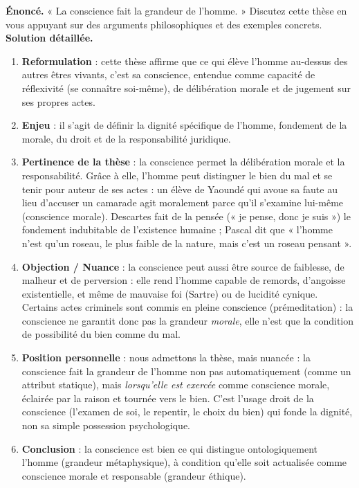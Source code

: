 \documentclass[11pt]{article}
\newcommand{\cle}[1]{{\popxbold\color{popdark}#1}}
\begin{document}
\begin{exoresolu}
\textbf{Énoncé.} « La conscience fait la grandeur de l'homme. » Discutez cette thèse en vous appuyant sur des arguments philosophiques et des exemples concrets.
\tcblower
\textbf{Solution détaillée.}
\begin{enumerate}
\item \textbf{Reformulation} : cette thèse affirme que ce qui élève l'homme au-dessus des autres êtres vivants, c'est sa conscience, entendue comme capacité de réflexivité (se connaître soi-même), de délibération morale et de jugement sur ses propres actes.
\item \textbf{Enjeu} : il s'agit de définir la dignité spécifique de l'homme, fondement de la morale, du droit et de la responsabilité juridique.
\item \textbf{Pertinence de la thèse} : la conscience permet la délibération morale et la responsabilité. Grâce à elle, l'homme peut distinguer le bien du mal et se tenir pour auteur de ses actes : un élève de Yaoundé qui avoue sa faute au lieu d'accuser un camarade agit moralement parce qu'il s'examine lui-même (conscience morale). Descartes fait de la pensée (« je pense, donc je suis ») le fondement indubitable de l'existence humaine ; Pascal dit que « l'homme n'est qu'un roseau, le plus faible de la nature, mais c'est un roseau pensant ».
\item \textbf{Objection / Nuance} : la conscience peut aussi être source de faiblesse, de malheur et de perversion : elle rend l'homme capable de remords, d'angoisse existentielle, et même de \cle{mauvaise foi} (Sartre) ou de lucidité cynique. Certains actes criminels sont commis en pleine conscience (prémeditation) : la conscience ne garantit donc pas la grandeur \emph{morale}, elle n'est que la condition de possibilité du bien comme du mal.
\item \textbf{Position personnelle} : nous admettons la thèse, mais nuancée : la conscience fait la grandeur de l'homme non pas automatiquement (comme un attribut statique), mais \emph{lorsqu'elle est exercée} comme conscience morale, éclairée par la raison et tournée vers le bien. C'est l'usage droit de la conscience (l'examen de soi, le repentir, le choix du bien) qui fonde la dignité, non sa simple possession psychologique.
\item \textbf{Conclusion} : la conscience est bien ce qui distingue ontologiquement l'homme (grandeur métaphysique), à condition qu'elle soit actualisée comme conscience morale et responsable (grandeur éthique).
\end{enumerate}
\end{exoresolu}
\end{document}
